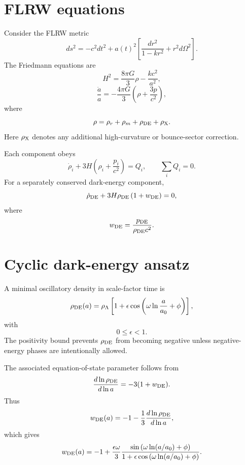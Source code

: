 \documentclass[11pt]{article}
\theoremstyle{remark}
\begin{document}
\section{FLRW equations}
Consider the FLRW metric
\begin{equation}
    ds^2=-c^2dt^2+a(t)^2\left[\frac{dr^2}{1-kr^2}+r^2d\Omega^2\right].
\end{equation}
The Friedmann equations are
\begin{equation}
    H^2=\frac{8\pi G}{3}\rho-\frac{kc^2}{a^2},
    \label{eq:friedmann1}
\end{equation}
\begin{equation}
    \frac{\ddot a}{a}= -\frac{4\pi G}{3}\left(\rho+\frac{3p}{c^2}\right),
    \label{eq:friedmann2}
\end{equation}
where
\begin{equation}
    \rho=\rho_r+\rho_m+\rho_{\rm DE}+\rho_{\rm X}.
\end{equation}
Here $\rho_{\rm X}$ denotes any additional high-curvature or bounce-sector correction.

Each component obeys
\begin{equation}
    \dot\rho_i+3H\left(\rho_i+\frac{p_i}{c^2}\right)=Q_i,
    \qquad
    \sum_i Q_i=0.
\end{equation}
For a separately conserved dark-energy component,
\begin{equation}
    \dot\rho_{\rm DE}+3H\rho_{\rm DE}\left(1+w_{\rm DE}\right)=0,
\end{equation}
where
\begin{equation}
    w_{\rm DE}=\frac{p_{\rm DE}}{\rho_{\rm DE}c^2}.
\end{equation}

\section{Cyclic dark-energy ansatz}
A minimal oscillatory density in scale-factor time is
\begin{equation}
    \rho_{\rm DE}(a)
    =\rho_{\Lambda}
    \left[1+\epsilon\cos\left(\omega\ln\frac{a}{a_0}+\phi\right)\right],
    \label{eq:rho-de-osc}
\end{equation}
with
\begin{equation}
    0\leq \epsilon<1.
\end{equation}
The positivity bound prevents $\rho_{\rm DE}$ from becoming negative unless negative-energy phases are intentionally allowed.

The associated equation-of-state parameter follows from
\begin{equation}
    \frac{d\ln\rho_{\rm DE}}{d\ln a}=-3(1+w_{\rm DE}).
\end{equation}
Thus
\begin{equation}
    w_{\rm DE}(a)
    =-1-\frac{1}{3}\frac{d\ln\rho_{\rm DE}}{d\ln a},
\end{equation}
which gives
\begin{equation}
    w_{\rm DE}(a)
    =-1+\frac{\epsilon\omega}{3}
    \frac{\sin\left(\omega\ln(a/a_0)+\phi\right)}
    {1+\epsilon\cos\left(\omega\ln(a/a_0)+\phi\right)}.
    \label{eq:wde}
\end{equation}
\end{document}
